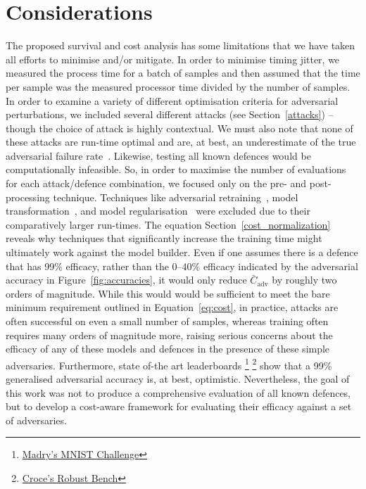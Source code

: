 \section{Considerations}
The proposed survival and cost analysis  has some limitations that we have taken all efforts to minimise and/or mitigate. In order to minimise timing jitter, we measured the process time for a batch of samples and then assumed that the time per sample was the measured processor time divided by the number of samples. In order to examine a variety of different optimisation criteria for adversarial perturbations, we included several different attacks (see Section~\ref{attacks}) -- though the choice of attack is highly contextual. We must also note that none of these attacks are run-time optimal and are, at best, an underestimate of the true adversarial failure rate~\cite{meyers}.
Likewise, testing all known defences would be computationally infeasible. So, in order to maximise the number of evaluations for each attack/defence combination, we focused only on the pre- and post-processing technique. Techniques like adversarial retraining~\cite{croce_reliable_2020}, model transformation~\cite{papernot_distillation_2016}, and model regularisation~\cite{jakubovitz2018improving} were excluded due to their comparatively larger run-times. The equation Section~\ref{cost_normalization} reveals why techniques that significantly increase the training time might ultimately work against the model builder.
Even if one assumes there is a defence that has 99\% efficacy, rather than the 0--40\% efficacy indicated by the adversarial accuracy in Figure~\ref{fig:accuracies}, it would only reduce $\bar{C}_{\mathrm{adv}}$ by roughly two orders of magnitude. While this would would be sufficient to meet the bare minimum requirement outlined in Equation~\ref{eq:cost}, in practice, attacks are often successful on even a small number of samples, whereas training often requires many orders of magnitude more, raising serious concerns about the efficacy of any of these models and defences in the presence of these simple adversaries.
Furthermore, state of-the art leaderboards
\footnote{\href{https://github.com/MadryLab/mnist\_challenge}{Madry's MNIST Challenge}}
\footnote{\href{https://ml.cs.tsinghua.edu.cn/adv\-bench/}{Croce's Robust Bench}}
show that a 99\% generalised adversarial accuracy is, at best, optimistic. Nevertheless, the goal of this work was not to produce a comprehensive evaluation of all known defences, but to develop a cost-aware framework for evaluating their efficacy against a set of adversaries.

